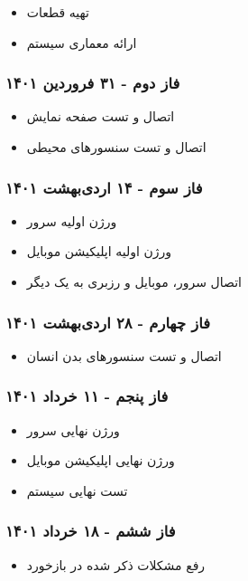 \documentclass[12pt]{article}
\begin{document}
	\begin{itemize}
		\item تهیه قطعات
		\item  ارائه معماری سیستم
	\end{itemize}
	
	\subsubsection*{فاز دوم - ۳۱ فروردین ۱۴۰۱}
	
	\begin{itemize}
		\item  اتصال و تست صفحه نمایش
		\item  اتصال و تست سنسورهای محیطی
	\end{itemize}
	
	\subsubsection*{فاز سوم - ۱۴ اردی‌بهشت ۱۴۰۱}
	
	\begin{itemize}
		\item ورژن اولیه سرور
		\item ورژن اولیه اپلیکیشن موبایل
		\item  اتصال سرور، موبایل و رزبری به یک دیگر
	\end{itemize}
	
	\subsubsection*{فاز چهارم - ۲۸ اردی‌بهشت ۱۴۰۱}
	
		
	\begin{itemize}
		\item اتصال و تست سنسورهای بدن انسان 
	\end{itemize}

	\subsubsection*{فاز پنجم - ۱۱ خرداد ۱۴۰۱}
	
		
	\begin{itemize}
		\item ورژن نهایی سرور
		\item ورژن نهایی اپلیکیشن موبایل
		\item  تست نهایی سیستم
	\end{itemize}
	
	\subsubsection*{فاز ششم - ۱۸ خرداد ۱۴۰۱}
	
			
	\begin{itemize}
		\item رفع مشکلات ذکر شده در بازخورد 
	\end{itemize}
\end{document}
